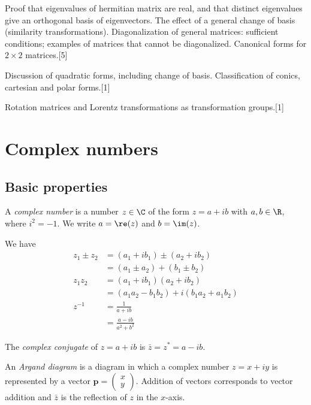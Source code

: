 \documentclass[a4paper]{article}
\begin{document}
{\vspace{5pt}
\noindent Proof that eigenvalues of hermitian matrix are real, and that distinct eigenvalues give an orthogonal basis of eigenvectors. The effect of a general change of basis (similarity transformations). Diagonalization of general matrices: sufficient conditions; examples of matrices that cannot be diagonalized. Canonical forms for $2 \times 2$ matrices.\hspace*{\fill}[5]

\vspace{5pt}
\noindent Discussion of quadratic forms, including change of basis. Classification of conics, cartesian and polar forms.\hspace*{\fill}[1]

\vspace{5pt}
\noindent Rotation matrices and Lorentz transformations as transformation groups.\hspace*{\fill}[1]}

\tableofcontents

\section{Complex numbers}
\subsection{Basic properties}
\begin{defi}
  A \emph{complex number} is a number $z\in \C$ of the form $z = a + ib$ with $a, b\in \R$, where $i^2=-1$. We write $a = \re(z)$ and $b = \im(z)$.
\end{defi}

We have
\begin{align*}
  z_1\pm z_2 &= (a_1 + ib_1)\pm (a_2 + ib_2)\\
  &= (a_1\pm a_2) + (b_1 \pm b_2)\\
  z_1z_2 &= (a_1 + ib_1)(a_2 + ib_2)\\
  &= (a_1a_2 - b_1b_2) + i(b_1a_2 + a_1b_2)\\
  z^{-1} &= \frac{1}{a + ib}\\
  &= \frac{a - ib}{a^2 + b^2}
\end{align*}
\begin{defi}
  The \emph{complex conjugate} of $z = a+ ib$ is $\bar{z} = z^* = a - ib$.
\end{defi}

\begin{defi}
  An \emph{Argand diagram} is a diagram in which a complex number $z = x + iy$ is represented by a vector $\mathbf{p}=\begin{pmatrix}x\\y\end{pmatrix}$. Addition of vectors corresponds to vector addition and $\bar{z}$ is the reflection of $z$ in the $x$-axis.
\end{defi}
\end{document}
